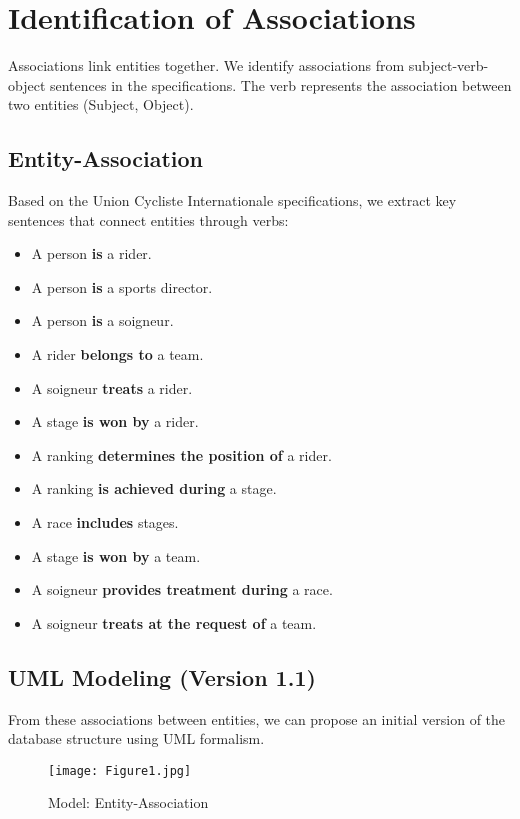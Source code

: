 \section{Identification of Associations}

Associations link entities together. We identify associations from subject-verb-object sentences in the specifications. The verb represents the association between two entities (Subject, Object).

\subsection{Entity-Association}
Based on the Union Cycliste Internationale specifications, we extract key sentences that connect entities through verbs:

\begin{itemize}
\item A person \textbf{is} a rider.
\item A person \textbf{is} a sports director.
\item A person \textbf{is} a soigneur.
\item A rider \textbf{belongs to} a team.
\item A soigneur \textbf{treats} a rider.
\item A stage \textbf{is won by} a rider.
\item A ranking \textbf{determines the position of} a rider.
\item A ranking \textbf{is achieved during} a stage.
\item A race \textbf{includes} stages.
\item A stage \textbf{is won by} a team.
\item A soigneur \textbf{provides treatment during} a race.
\item A soigneur \textbf{treats at the request of} a team.
\end{itemize}

\subsection{UML Modeling (Version 1.1)}
From these associations between entities, we can propose an initial version of the database structure using UML formalism.

\begin{figure}[H]
\begin{center}
\texttt{[image: Figure1.jpg]}\\
\caption{Model: Entity-Association}
\label{fig1}
\end{center}
\end{figure}
